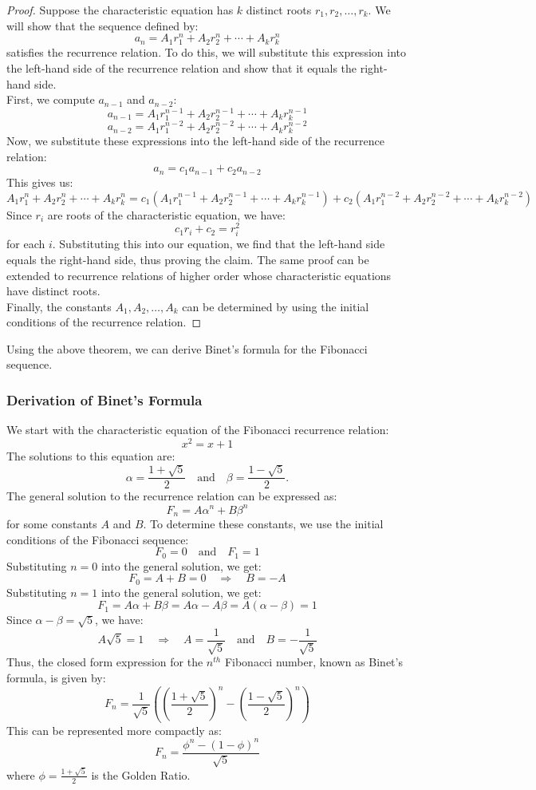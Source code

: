 \documentclass[openany]{book}
\begin{document}
\begin{proof}
    Suppose the characteristic equation has $k$ distinct roots $r_1, r_2, \ldots, r_k$. We will show that the sequence defined by:
    \[
        a_n = A_1 r_1^n + A_2 r_2^n + \cdots + A_k r_k^n
    \]
    satisfies the recurrence relation. To do this, we will substitute this expression into the left-hand side of the recurrence relation and show that it equals the right-hand side. \\
    First, we compute $a_{n-1}$ and $a_{n-2}$:
    \[
        a_{n-1} = A_1 r_1^{n-1} + A_2 r_2^{n-1} + \cdots + A_k r_k^{n-1}
    \]
    \[
        a_{n-2} = A_1 r_1^{n-2} + A_2 r_2^{n-2} + \cdots + A_k r_k^{n-2}
    \]
    Now, we substitute these expressions into the left-hand side of the recurrence relation:
    \[
        a_n = c_1 a_{n-1} + c_2 a_{n-2}
    \]
    This gives us:
    \[
        A_1 r_1^n + A_2 r_2^n + \cdots + A_k r_k^n = c_1 (A_1 r_1^{n-1} + A_2 r_2^{n-1} + \cdots + A_k r_k^{n-1}) + c_2 (A_1 r_1^{n-2} + A_2 r_2^{n-2} + \cdots + A_k r_k^{n-2})
    \]
    Since $r_i$ are roots of the characteristic equation, we have:
    \[
        c_1 r_i + c_2 = r_i^2
    \]
    for each $i$. Substituting this into our equation, we find that the left-hand side equals the right-hand side, thus proving the claim. The same proof can be extended to recurrence relations of higher order whose characteristic equations have distinct roots. \\
    Finally, the constants $A_1, A_2, \ldots, A_k$ can be determined by using the initial conditions of the recurrence relation.
\end{proof}
\noindent
Using the above theorem, we can derive Binet's formula for the Fibonacci sequence. 
\subsubsection{Derivation of Binet's Formula}
We start with the characteristic equation of the Fibonacci recurrence relation:
\[
    x^2 = x + 1
\]
The solutions to this equation are:
\[
    \alpha = \frac{1 + \sqrt{5}}{2} \quad \text{and} \quad \beta = \frac{1 - \sqrt{5}}{2}.
\]
The general solution to the recurrence relation can be expressed as:
\[
    F_n = A \alpha^n + B \beta^n
\]
for some constants $A$ and $B$. To determine these constants, we use the initial conditions of the Fibonacci sequence:
\[    F_0 = 0 \quad \text{and} \quad F_1 = 1
\]
Substituting $n = 0$ into the general solution, we get:
\[    F_0 = A + B = 0 \quad \Rightarrow \quad B = -A
\]
Substituting $n = 1$ into the general solution, we get:
\[    F_1 = A \alpha + B \beta = A \alpha - A \beta = A(\alpha - \beta) = 1
\]
Since $\alpha - \beta = \sqrt{5}$, we have:
\[    A \sqrt{5} = 1 \quad \Rightarrow \quad A = \frac{1}{\sqrt{5}} \quad \text{and} \quad B = -\frac{1}{\sqrt{5}}
\]
Thus, the closed form expression for the $n^{th}$ Fibonacci number, known as Binet's formula, is given by:
\[
    F_n = \frac{1}{\sqrt{5}} \left( \left( \frac{1 + \sqrt{5}}{2} \right)^n - \left( \frac{1 - \sqrt{5}}{2} \right)^n \right)
\]
This can be represented more compactly as:
\[
    F_n = \frac{\phi^n - (1 - \phi)^n}{\sqrt{5}}
\]
where $\phi = \frac{1 + \sqrt{5}}{2}$ is the Golden Ratio.
\end{document}

